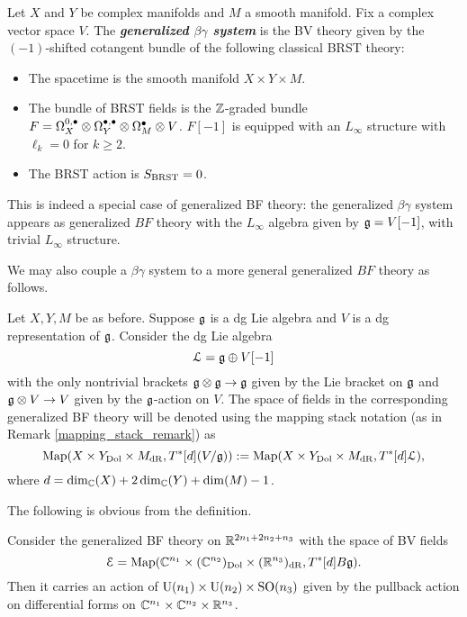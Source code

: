 \documentclass[10pt, oneside]{article}
\renewcommand{\U}{\mathrm{U}}
\newcommand{\defterm}[1]{\textbf{\emph{#1}}}
\begin{document}
\begin{definition}
Let $X$ and $Y$ be complex manifolds and $M$ a smooth manifold. Fix a complex vector space $V$. The \defterm{generalized $\beta\gamma$ system} is the BV theory given by the $(-1)$-shifted cotangent bundle of the following classical BRST theory:
\begin{itemize}
\item The spacetime is the smooth manifold $X\times Y\times M$.

\item The bundle of BRST fields is the $\mathbb Z$-graded bundle $F = \Omega^{0,\bullet}_X \otimes \Omega^{\bullet,\bullet}_Y \otimes \Omega^\bullet_M \otimes V$. $F[-1]$ is equipped with an $L_\infty$ structure with $\ell_{k} = 0$ for $k \geq 2$. 

\item The BRST action is $S_{\mathrm{BRST}} = 0$.
\end{itemize}
\end{definition}

\begin{rmk}
This is indeed a special case of generalized BF theory: the generalized $\beta\gamma$ system appears as generalized $BF$ theory with the $L_\infty$ algebra given by $\mathfrak g = V[-1]$, with trivial $L_\infty$ structure. 
\end{rmk}

We may also couple a $\beta\gamma$ system to a more general generalized $BF$ theory as follows.

\begin{example}
Let $X,Y,M$ be as before. Suppose $\mathfrak g$ is a dg Lie algebra and $V$ is a dg representation of $\mathfrak g$. Consider the dg Lie algebra
\[\mathcal L = \mathfrak g\oplus V[-1]\]
with the only nontrivial brackets $\mathfrak g\otimes \mathfrak g\rightarrow \mathfrak g$ given by the Lie bracket on $\mathfrak g$ and $\mathfrak g\otimes V\rightarrow V$ given by the $\mathfrak g$-action on $V$. The space of fields in the corresponding generalized BF theory will be denoted using the mapping stack notation (as in Remark \ref{mapping_stack_remark}) as
\[\operatorname{Map}(X\times Y_{\mathrm{Dol}}\times M_{\mathrm{dR}}, T^*[d] (V / \mathfrak g)):=\operatorname{Map}(X\times Y_{\mathrm{Dol}}\times M_{\mathrm{dR}}, T^*[d] \mathcal L),\]
where $d = \dim_\mathbb C(X) + 2\dim_\mathbb C(Y) + \dim(M) - 1$.
\end{example}

The following is obvious from the definition.

\begin{prop}
Consider the generalized BF theory on $\mathbb R^{2n_1+2n_2+n_3}$ with the space of BV fields
\[\mathcal E = \operatorname{Map}(\mathbb C^{n_1}\times (\mathbb C^{n_2})_{\mathrm{Dol}}\times (\mathbb R^{n_3})_{\mathrm{dR}}, T^*[d] B\mathfrak g).\]
Then it carries an action of $\U(n_1)\times \U(n_2)\times \SO(n_3)$ given by the pullback action on differential forms on $\mathbb C^{n_1}\times \mathbb C^{n_2}\times \mathbb R^{n_3}$.
\label{prop:BFrotationaction}
\end{prop}
\end{document}
